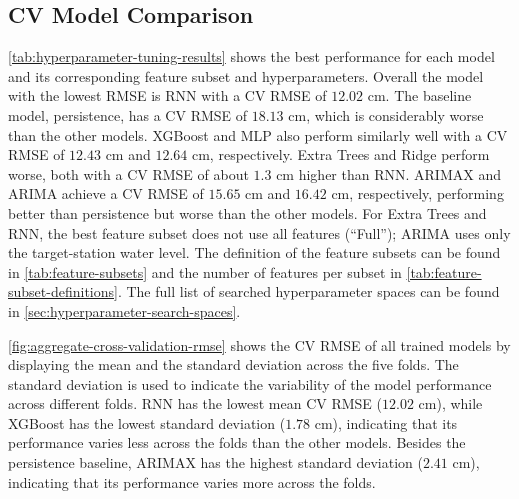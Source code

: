 \subsection{\acl{CV} Model Comparison}
\autoref{tab:hyperparameter-tuning-results} shows the best performance for each model and its corresponding feature subset and hyperparameters. Overall the model with the lowest \ac{RMSE} is \ac{RNN} with a \ac{CV} \ac{RMSE} of $12.02$ cm. The baseline model, persistence, has a \ac{CV} \ac{RMSE} of $18.13$ cm, which is considerably worse than the other models. XGBoost and \ac{MLP} also perform similarly well with a \ac{CV} \ac{RMSE} of $12.43$ cm and $12.64$ cm, respectively. Extra Trees and Ridge perform worse, both with a \ac{CV} \ac{RMSE} of about $1.3$ cm higher than \ac{RNN}. \ac{ARIMAX} and \ac{ARIMA} achieve a \ac{CV} \ac{RMSE} of $15.65$ cm and $16.42$ cm, respectively, performing better than persistence but worse than the other models. For Extra Trees and \ac{RNN}, the best feature subset does not use all features (``Full''); \ac{ARIMA} uses only the target-station water level. The definition of the feature subsets can be found in \autoref{tab:feature-subsets} and the number of features per subset in \autoref{tab:feature-subset-definitions}. The full list of searched hyperparameter spaces can be found in \autoref{sec:hyperparameter-search-spaces}.
\begin{table}[htbp]
  \centering
  
  \caption{Selected feature subsets, hyperparameters, and \ac{CV} \ac{RMSE} for the tuned forecasting models.}\label{tab:hyperparameter-tuning-results}
\end{table}


\autoref{fig:aggregate-cross-validation-rmse} shows the \ac{CV} \ac{RMSE} of all trained models by displaying the mean and the standard deviation across the five folds. The standard deviation is used to indicate the variability of the model performance across different folds. \ac{RNN} has the lowest mean \ac{CV} \ac{RMSE} ($12.02$ cm), while XGBoost has the lowest standard deviation ($1.78$ cm), indicating that its performance varies less across the folds than the other models. Besides the persistence baseline, \ac{ARIMAX} has the highest standard deviation ($2.41$ cm), indicating that its performance varies more across the folds.

